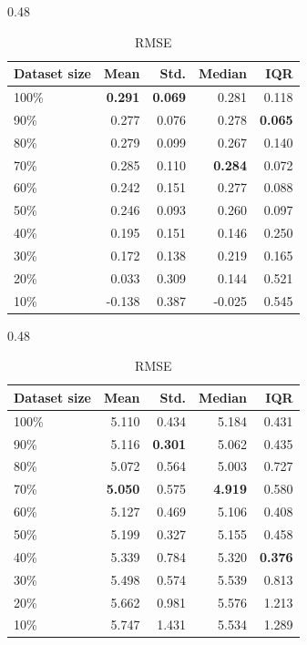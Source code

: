 \begin{table}[H]
\centering
\caption{GLM Model performance across varying dataset-size scenarios.}
\label{tab:glm-data-size-random-cv-test}

\begin{subtable}{0.48\textwidth}
\centering
\small
\caption{\(R^2\)}
\label{tab:r2-glm-data-size-random-cv}
\begin{tabular}{lrrrr}
\toprule
\textbf{Dataset size} & \textbf{Mean} & \textbf{Std.} & \textbf{Median} & \textbf{IQR} \\
\midrule
100\% & \textbf{0.291} & \textbf{0.069} & 0.281 & 0.118 \\
90\%  & 0.277 & 0.076 & 0.278 & \textbf{0.065} \\
80\%  & 0.279 & 0.099 & 0.267 & 0.140 \\
70\%  & 0.285 & 0.110 & \textbf{0.284} & 0.072 \\
60\%  & 0.242 & 0.151 & 0.277 & 0.088 \\
50\%  & 0.246 & 0.093 & 0.260 & 0.097 \\
40\%  & 0.195 & 0.151 & 0.146 & 0.250 \\
30\%  & 0.172 & 0.138 & 0.219 & 0.165 \\
20\%  & 0.033 & 0.309 & 0.144 & 0.521 \\
10\%  & -0.138 & 0.387 & -0.025 & 0.545 \\
\bottomrule
\end{tabular}
\end{subtable}
\hfill
\begin{subtable}{0.48\textwidth}
\centering
\small
\caption{RMSE}
\label{tab:rmse-glm-data-size-random-cv}
\begin{tabular}{lrrrr}
\toprule
\textbf{Dataset size} & \textbf{Mean} & \textbf{Std.} & \textbf{Median} & \textbf{IQR} \\
\midrule
100\% & 5.110 & 0.434 & 5.184 & 0.431 \\
90\%  & 5.116 & \textbf{0.301} & 5.062 & 0.435 \\
80\%  & 5.072 & 0.564 & 5.003 & 0.727 \\
70\%  & \textbf{5.050} & 0.575 & \textbf{4.919} & 0.580 \\
60\%  & 5.127 & 0.469 & 5.106 & 0.408 \\
50\%  & 5.199 & 0.327 & 5.155 & 0.458 \\
40\%  & 5.339 & 0.784 & 5.320 & \textbf{0.376} \\
30\%  & 5.498 & 0.574 & 5.539 & 0.813 \\
20\%  & 5.662 & 0.981 & 5.576 & 1.213 \\
10\%  & 5.747 & 1.431 & 5.534 & 1.289 \\
\bottomrule
\end{tabular}
\end{subtable}


\end{table}
